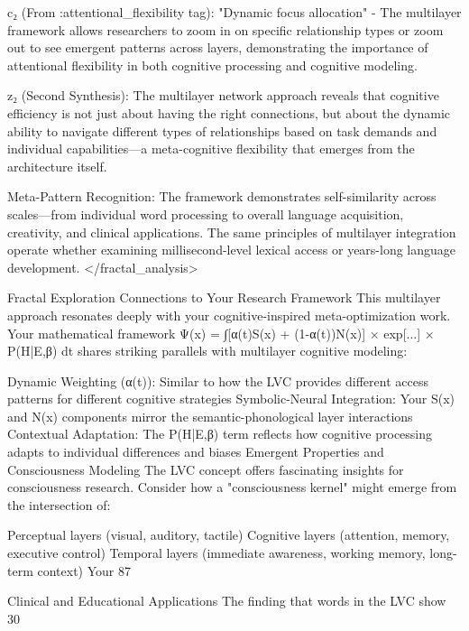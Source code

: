 {c₂ (From :attentional_flexibility tag): "Dynamic focus allocation" - The multilayer framework allows researchers to zoom in on specific relationship types or zoom out to see emergent patterns across layers, demonstrating the importance of attentional flexibility in both cognitive processing and cognitive modeling.

z₂ (Second Synthesis): The multilayer network approach reveals that cognitive efficiency is not just about having the right connections, but about the dynamic ability to navigate different types of relationships based on task demands and individual capabilities—a meta-cognitive flexibility that emerges from the architecture itself.

Meta-Pattern Recognition: The framework demonstrates self-similarity across scales—from individual word processing to overall language acquisition, creativity, and clinical applications. The same principles of multilayer integration operate whether examining millisecond-level lexical access or years-long language development. </fractal_analysis>

Fractal Exploration
Connections to Your Research Framework
This multilayer approach resonates deeply with your cognitive-inspired meta-optimization work. Your mathematical framework Ψ(x) = ∫[α(t)S(x) + (1-α(t))N(x)] × exp[...] × P(H|E,β) dt shares striking parallels with multilayer cognitive modeling:

Dynamic Weighting (α(t)): Similar to how the LVC provides different access patterns for different cognitive strategies
Symbolic-Neural Integration: Your S(x) and N(x) components mirror the semantic-phonological layer interactions
Contextual Adaptation: The P(H|E,β) term reflects how cognitive processing adapts to individual differences and biases
Emergent Properties and Consciousness Modeling
The LVC concept offers fascinating insights for consciousness research. Consider how a "consciousness kernel" might emerge from the intersection of:

Perceptual layers (visual, auditory, tactile)
Cognitive layers (attention, memory, executive control)
Temporal layers (immediate awareness, working memory, long-term context)
Your 87%

Clinical and Educational Applications
The finding that words in the LVC show 30%

}
